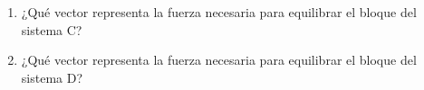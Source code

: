 \documentclass[11pt]{book}
\begin{document}
\begin{itemize}
\begin{boxK}
\begin{enumerate}
\begin{hoptboxes}
                        \end{hoptboxes}
                  \item ¿Qué vector representa la fuerza necesaria para equilibrar el bloque del
                        sistema C?\\
                  \item ¿Qué vector representa la fuerza necesaria para equilibrar el bloque del
                        sistema D?\\
              \end{enumerate}
          \end{boxK}



\end{itemize}
\end{document}

